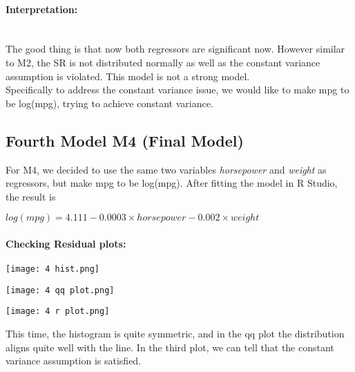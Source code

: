 \documentclass[12pt]{article}
\begin{document}
\paragraph{Interpretation:}~{}\\
The good thing is that now both regressors are significant now. However similar to M2, the SR is not distributed normally as well as the constant variance assumption is violated. This model is not a strong model. \\
Specifically to address the constant variance issue, we would like to make mpg to be log(mpg), trying to achieve constant variance.







\subsection{Fourth Model M4 (Final Model)}
For M4, we decided to use the same two variables \textit{horsepower} and \textit{weight} as regressors, but make mpg to be log(mpg).
After fitting the model in R Studio, the result is 
\begin{center}
$ log(mpg) = 4.111  -0.0003 \times horsepower  -0.002 \times weight $
\end{center}
\paragraph{Checking Residual plots:}
\begin{minipage}{\textwidth}
    \begin{minipage}[h]{0.3\linewidth}
        \centering
        \texttt{[image: 4 hist.png]}
        \label{a}
    \end{minipage}
    \begin{minipage}[h]{0.3\linewidth}
        \centering
        \texttt{[image: 4 qq plot.png]}
        \label{b}   
    \end{minipage}
    \begin{minipage}[h]{0.3\linewidth}
        \centering
        \texttt{[image: 4 r plot.png]}
        \label{b}   
    \end{minipage}
\end{minipage}
This time, the histogram is quite symmetric, and in the qq plot the distribution aligns quite well with the line. In the third plot, we can tell that the constant variance assumption is satisfied.\\ 
\end{document}
